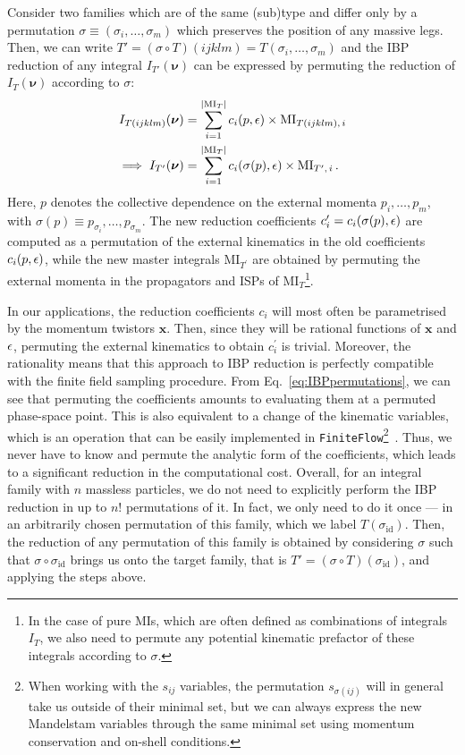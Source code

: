\documentclass[main.tex]{subfiles}
\begin{document}
Consider two families which are of the same (sub)type and differ only by a permutation $\sigma \equiv (\sigma_i, \ldots, \sigma_m)$ which preserves the position of any massive legs. Then, we can write $T'=(\sigma \circ T)(ijklm) = T(\sigma_i, \ldots, \sigma_m)$ and the IBP reduction of any integral $I_{T'}(\bm{\nu})$ can be expressed by permuting the reduction of $I_T(\bm{\nu})$ according to $\sigma$:
\begin{align} \label{eq:IBPpermutations}
    I_{T(ijklm)}(\bm{\nu}) &= \sum_{i=1}^{|\text{MI}_T|} c_i(p, \epsilon) \times \text{MI}_{T(ijklm),\,i} \nonumber \\
    \implies I_{T'}(\bm{\nu}) &= \sum_{i=1}^{|\text{MI}_T|} c_i(\sigma(p), \epsilon) \times \text{MI}_{T^\prime,\,i}\,.
\end{align}
Here, $p$ denotes the collective dependence on the external momenta $p_i, \ldots, p_m$, with $\sigma(p) \equiv p_{\sigma_i}, \ldots, p_{\sigma_m}$. The new reduction coefficients $c^\prime_i = c_i(\sigma(p), \epsilon)$ are computed as a permutation of the external kinematics in the old coefficients $c_i(p, \epsilon)$, while the new master integrals MI$_{T^\prime}$ are obtained by permuting the external momenta in the propagators and ISPs of MI$_T$\footnote{In the case of pure MIs, which are often defined as combinations of integrals $I_T$, we also need to permute any potential kinematic prefactor of these integrals according to $\sigma$.}.

In our applications, the reduction coefficients $c_i$ will most often be parametrised by the momentum twistors $\mathbf{x}$. Then, since they will be rational functions of $\mathbf{x}$ and $\epsilon$, permuting the external kinematics to obtain $c_i^\prime$ is trivial. Moreover, the rationality means that this approach to IBP reduction is perfectly compatible with the finite field sampling procedure. From Eq.~\ref{eq:IBPpermutations}, we can see that permuting the coefficients amounts to evaluating them at a permuted phase-space point. This is also equivalent to a change of the kinematic variables, which is an operation that can be easily implemented in \texttt{FiniteFlow}\footnote{When working with the $s_{ij}$ variables, the permutation $s_{\sigma(ij)}$ will in general take us outside of their minimal set, but we can always express the new Mandelstam variables through the same minimal set using momentum conservation and on-shell conditions.}~\cite{Peraro:2019svx}. Thus, we never have to know and permute the analytic form of the coefficients, which leads to a significant reduction in the computational cost. Overall, for an integral family with $n$ massless particles, we do not need to explicitly perform the IBP reduction in up to $n!$ permutations of it. In fact, we only need to do it once --- in an arbitrarily chosen permutation of this family, which we label $T(\sigma_\text{id})$. Then, the reduction of any permutation of this family is obtained by considering $\sigma$ such that $\sigma \circ \sigma_\text{id}$ brings us onto the target family, that is $T' = (\sigma \circ T)(\sigma_\text{id})$, and applying the steps above.
\end{document}
